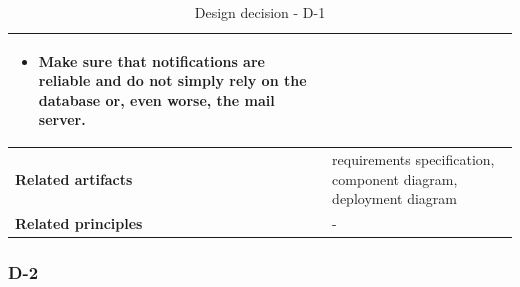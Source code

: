 \documentclass[11pt]{article}
\begin{document}
\begin{table}[h]
\begin{tabularx}{\textwidth}{ | l | X |}
\begin{itemize}
		\item Make sure that notifications are reliable and do not simply rely on the database or, even worse, the mail server.
		\end{itemize}\\
	\hline
	\cellcolor[gray]{0.9}
	\textbf{Related artifacts} & requirements specification, component diagram, deployment diagram \\
	\hline
	\cellcolor[gray]{0.9}
	\textbf{Related principles} & -\\
	\hline
	\end{tabularx}
	\caption{Design decision - D-1}
	\label{dec:D1}
\end{table}

\newpage

\subsubsection{D-2}
\end{document}
